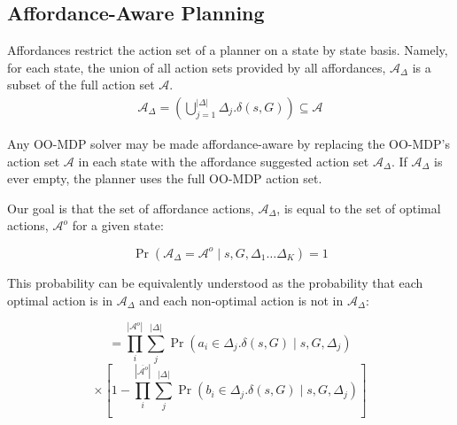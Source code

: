 \documentclass[conference]{IEEEtran}
\newcommand{\dnote}[1]{\textcolor{Green}{\textbf{D: #1}}}
\newcommand{\enote}[1]{\textcolor{Red}{\textbf{E: #1}}}
\begin{document}
\subsection{Affordance-Aware Planning}
Affordances restrict the action set of a planner on a state by state basis. Namely, for each state, the union of all action sets provided by all affordances, $\mathcal{A}_{\Delta}$ is a subset of the full action set $\mathcal{A}$. 
\begin{align}
\mathcal{A}_{\Delta} = \left(\bigcup\limits_{j = 1}^{|\Delta|} \Delta_j.\delta(s,G) \right) \subseteq \mathcal{A}
\label{eq:afford_union}
\end{align}

Any OO-MDP solver may be made affordance-aware by replacing the OO-MDP's action set $\mathcal{A}$ in each state with the affordance suggested action set $\mathcal{A}_\Delta$. If $\mathcal{A}_\Delta$ is ever empty, the planner uses the full OO-MDP action set.

Our goal is that the set of affordance actions, $\mathcal{A}_{\Delta}$, is equal to the set of optimal actions, $\mathcal{A}^o$ for a given state:

\begin{equation} 
\Pr( \mathcal{A}_{\Delta} = \mathcal{A}^o \mid s, G, \Delta_1 \dots \Delta_K) = 1
\label{eq:opt}
\end{equation}


This probability can be equivalently understood as the probability that each
optimal action is in $\mathcal{A}_{\Delta}$ and each non-optimal action is not in $\mathcal{A}_{\Delta}$: %

\begin{equation*}
= \prod_i^{|\mathcal{A}^o|} \sum_j^{|\Delta|} \Pr(a_i \in \Delta_j.\delta(s,G) \mid s, G, \Delta_j)\end{equation*}
\begin{equation}
\times \left[1 - \prod_i^{|\overline{\mathcal{A}^o}|} \sum_j^{|\Delta|} \Pr(b_i \in \Delta_j.\delta(s,G) \mid s, G, \Delta_j)\right]
\label{eq:isin_notin}
\end{equation}
\end{document}
